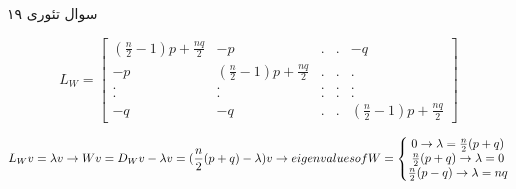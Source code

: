 سوال تئوری ۱۹

$$L_{W} = \begin{bmatrix}
(\frac{n}{2}-1)p + \frac{nq}{2} & -p & . & . & -q\\ 
 -p & (\frac{n}{2}-1)p + \frac{nq}{2}  & . & . & .\\ 
 .&  .& . & . & .\\ 
 .&  .& . & . & .\\ 
 -q& -q & . & . & (\frac{n}{2}-1)p + \frac{nq}{2}
\end{bmatrix}$$

$$L_{W}v =\lambda v \rightarrow Wv = D_{W}v - \lambda v = (\frac{n}{2}(p+q) - \lambda) v \rightarrow 
eigenvalues \space of \space W = \left\{\begin{matrix}
0 \rightarrow \lambda = \frac{n}{2}(p+q) \\ 
\frac{n}{2}(p+q) \rightarrow \lambda = 0\\ 
\frac{n}{2}(p-q) \rightarrow \lambda = nq
\end{matrix}\right.$$
